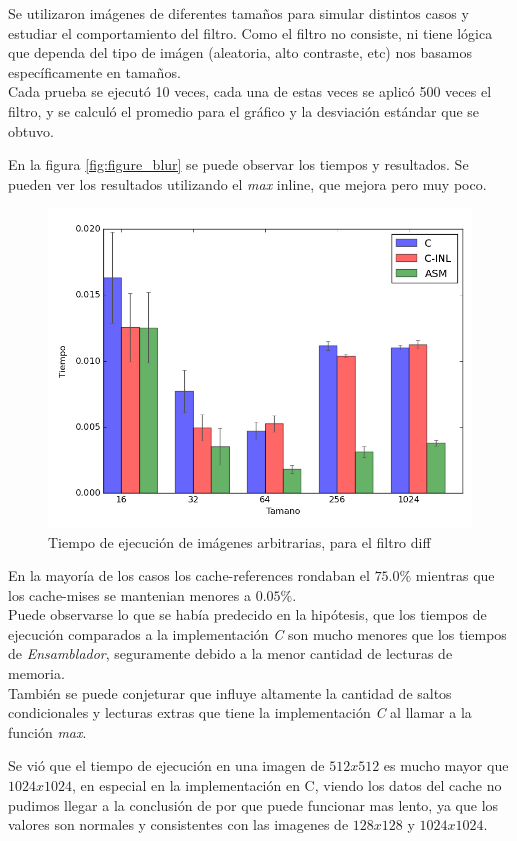 Se utilizaron im\'agenes de diferentes tama\~nos para simular distintos casos y estudiar el comportamiento del filtro. Como el filtro no consiste, ni tiene l\'ogica que dependa del tipo de im\'agen (aleatoria, alto contraste, etc) nos basamos espec\'ificamente en tama\~nos. \\
Cada prueba se ejecut\'o 10 veces, cada una de estas veces se aplic\'o 500 veces el filtro, y se calcul\'o el promedio para el gr\'afico y la desviaci\'on est\'andar que se obtuvo.

En la figura \ref{fig:figure_blur} se puede observar los tiempos y resultados. Se pueden ver los resultados utilizando el \emph{max} inline, que mejora pero muy poco.

\begin{figure}[htpb]
    \centering
    \caption{Tiempo de ejecuci\'on de im\'agenes arbitrarias, para el filtro diff }
    \label{fig:figure_diff}
    \includegraphics[width=0.75\columnwidth]{include/figure_diff}
\end{figure}

En la mayor\'ia de los casos los cache-references rondaban el $75.0\%$ mientras que los cache-mises se mantenian menores a $0.05\%$. \\
Puede observarse lo que se hab\'ia predecido en la hip\'otesis, que los tiempos de ejecuci\'on comparados a la implementaci\'on \emph{C} son mucho menores que los tiempos de \emph{Ensamblador}, seguramente debido a la menor cantidad de lecturas de memoria. \\
Tambi\'en se puede conjeturar que influye altamente la cantidad de saltos condicionales y lecturas extras que tiene la implementaci\'on \emph{C} al llamar a la funci\'on \emph{max}.


Se vi\'o que el tiempo de ejecuci\'on en una imagen de $512x512$ es mucho mayor que $1024x1024$, en especial en la implementaci\'on en C, viendo los datos del cache no pudimos llegar a la conclusi\'on de por que puede funcionar mas lento, ya que los valores son normales y consistentes con las imagenes de $128x128$ y $1024x1024$.

